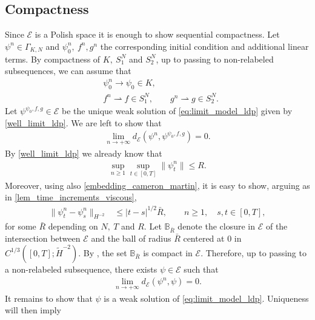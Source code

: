 \documentclass[a4paper,10pt]{amsart}
\theoremstyle{remark}
\numberwithin{equation}{section}
\begin{document}
\subsection{Compactness}\label{compactness_ldp}
Since $\mathcal{E}$ is a Polish space it is enough to show sequential compactness. Let $\psi^n\in \Gamma_{K,N}$ and $\psi_0^n,\ f^n,g^n$ the corresponding initial condition and additional linear terms. By compactness of $K,\ S_1^N$ and $S_2^N$, up to passing to non-relabeled subsequences, we can assume that \begin{align}\label{convergence_data_compactness_lemma}
        &\psi_0^n\rightarrow \psi_0\in K,
        \quad\\ \label{convergence_data_compactness_lemma_1}
        & f^n\rightharpoonup f\in S_1^N,\qquad 
        g^n\rightharpoonup g\in S_2^N.  
    \end{align}
    Let $\psi^{\psi_0,f,g}\in \mathcal{E}$ be the unique weak solution of \eqref{eq:limit_model_ldp} given by \cref{well_limit_ldp}. We are left to show that
    \begin{align*}
\lim_{n\rightarrow+\infty}d_{\mathcal{E}}\left(\psi^n,\psi^{\psi_0,f,g}\right)=0.
    \end{align*}
    By \cref{well_limit_ldp} we already know that 
    \begin{align}
       \sup_{n\geq 1} \sup_{t\in [0,T]}\|\psi^n_t\|\leq R.
    \end{align}
    Moreover, using also \eqref{embedding_cameron_martin}, it is easy to show, arguing as in \cref{lem_time_increments_viscous},
	    \begin{align*}
	        \|\psi^n_t-\psi^n_s\|_{H^{-2}}
	        &\leq |t-s|^{1/2}\bar{R},
	        \qquad n\geq1,\quad s,t\in[0,T],
	    \end{align*}
    for some $\bar{R}$ depending on $N,\ T$ and $R.$  Let $\mathbb{B}_{\bar{R}}$ denote the closure in $\mathcal{E}$ of the intersection between $\mathcal{E}$ and the ball of radius ${\bar{R}}$ centered at $0$ in $C^{1/3}([0,T];\tilde{H}^{-2})$.
    By \cite[Lemma 2.2]{crippa2025zero}, the set
    $\mathbb{B}_{\bar{R}}$ is compact in $\mathcal{E}$. Therefore, up
    to passing to a non-relabeled subsequence, there exists
    $\psi\in \mathcal{E}$ such that
    \begin{align}\label{convergence_stability}
\lim_{n\rightarrow+\infty}d_{\mathcal{E}}\left(\psi^n,\psi\right)=0.
    \end{align}
    It remains to show that $\psi$ is a weak solution of
    \eqref{eq:limit_model_ldp}. Uniqueness will then imply
\end{document}

